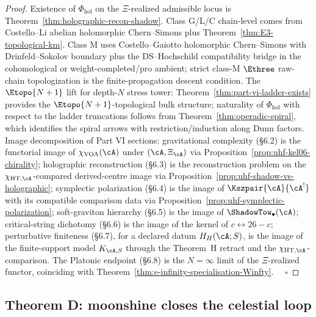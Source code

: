 \begin{proof}
Existence of $\Phi_{\mathrm{hol}}$ on the \(\Xi\)-realized admissible
locus is
Theorem~\ref{thm:holographic-recon-shadow}. Class G/L/C chain-level
comes from Costello--Li abelian holomorphic Chern--Simons plus
Theorem~\ref{thm:E3-topological-km}. Class M uses Costello--Gaiotto
holomorphic Chern--Simons with Drinfeld--Sokolov boundary plus the
DS--Hochschild compatibility bridge in the cohomological or
weight-completed/pro ambient; strict class-M $\Ethree$ raw-chain
topologization is the finite-propagation descent condition. The
$\Etopo{N+1}$ lift for
depth-$N$ stress
tower: Theorem~\ref{thm:part-vi-ladder-exists} provides the
$\Etopo{N+1}$-topological bulk structure; naturality of
$\Phi_{\mathrm{hol}}$ with respect to the ladder truncations follows
from Theorem~\ref{thm:operadic-spiral}, which identifies the spiral
arrows with restriction/induction along Dunn factors. Image
decomposition of Part VI sections: gravitational complexity
(\S6.2) is the functorial image of \(\chi_{\mathrm{VOA}}(\cA)\) under
\((\cA,\Xi_\cA)\) via
Proposition~\ref{prop:uhf-kel06-chirality}; holographic reconstruction
(\S6.3) is the reconstruction problem on the
\(\chi_{\mathrm{HT},\cA}\)-compared derived-centre image via
Proposition~\ref{prop:uhf-shadow-vs-holographic}; symplectic
polarization (\S6.4) is the image of \(\Kszpair{\cA}{\cA^!}\) with its
compatible comparison data via
Proposition~\ref{prop:uhf-symplectic-polarization}; soft-graviton
hierarchy (\S6.5) is the image of
\(\ShadowTow_\bullet(\cA)\); critical-string dichotomy (\S6.6) is the
image of the kernel of \(c \leftrightarrow 26-c\); perturbative
finiteness (\S6.7), for a declared datum \(H_H(\cA;S)\), is the image
of the finite-support model \(K_{\cA,S}\) through the Theorem~H
retract and the \(\chi_{\mathrm{HT},\cA}\)-comparison. The Platonic
endpoint (\S6.8) is the \(N=\infty\) limit of the
\(\Xi\)-realized functor, coinciding with
Theorem~\ref{thm:e-infinity-specialisation-Winfty}. $\quad\square$
\end{proof}

\subsection{Theorem D: moonshine closes the celestial loop}
\label{sec:part-vi-theorem-D}

